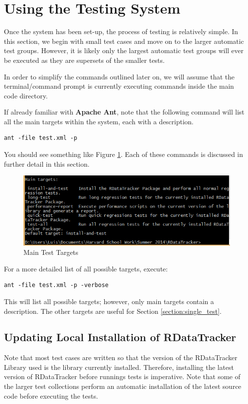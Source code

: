 \documentclass[12pt]{article}
\begin{document}
\section{Using the Testing System}
Once the system has been set-up, the process of testing is relatively simple. In this section, we begin with small test cases and move on to the larger automatic test groups. However, it is likely only the largest automatic test groups will ever be executed as they are supersets of the smaller tests. 

\bigskip

In order to simplify the commands outlined later on, we will assume that the terminal/command prompt is currently executing commands inside the main code directory.

\bigskip

If already familiar with \textbf{Apache Ant}, note that the following command will list all the main targets within the system, each with a description.
\begin{lstlisting}
ant -file test.xml -p
\end{lstlisting}
You should see something like Figure \ref{fig:main_test_targets}. Each of these commands is discussed in further detail in this section.

\begin{figure}[!ht]
\caption{Main Test Targets}
\label{fig:main_test_targets}
\begin{center}
\includegraphics[scale=0.6]{UsingRDataTrackerTests-img/main-out.PNG}
\end{center}
\end{figure}


For a more detailed list of all possible targets, execute:
\begin{lstlisting}
ant -file test.xml -p -verbose
\end{lstlisting}
This will list all possible targets; however, only main targets contain a description. The other targets are useful for Section \ref{section:single_test}.

\subsection{Updating Local Installation of RDataTracker}
Note that most test cases are written so that the version of the RDataTracker Library used is the library currently installed. Therefore, installing the latest version of RDataTracker before runnings tests is imperative. Note that some of the larger test collections perform an automatic installation of the latest source code before executing the tests. 
\end{document}
